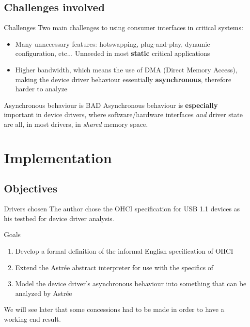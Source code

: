 \documentclass[aspectratio=169]{beamer}
\begin{document}
\subsection{Challenges involved}
\begin{frame}{Challenges}
Two main challenges to using consumer interfaces in critical systems:
\begin{itemize}
    \item Many unnecessary features: hotswapping, plug-and-play, dynamic configuration, etc... Unneeded in most \textbf{static} critical applications
    \item Higher bandwidth, which means the use of DMA (Direct Memory Access), making the device driver behaviour essentially \textbf{asynchronous}, therefore harder to analyze
\end{itemize}
\begin{alertblock}{Asynchronous behaviour is BAD}
Asynchronous behaviour is \textbf{especially} important in device drivers, where software/hardware interfaces \textit{and} driver state are all, in most drivers, in \textit{shared} memory space.
\end{alertblock}
\end{frame}

\section{Implementation}

\subsection{Objectives}
\begin{frame}{Drivers chosen}
    The author chose the OHCI specification for USB 1.1 devices as his testbed for device driver analysis.
    \begin{block}{Goals}
    \begin{enumerate}
        \item Develop a formal definition of the informal English specification of OHCI
        \item Extend the Astrée abstract interpreter for use with the specifics of 
        \item Model the device driver's asynchronous behaviour into something that can be analyzed by Astrée
    \end{enumerate}
    \end{block}
    We will see later that some concessions had to be made in order to have a working end result.
\end{frame}
\end{document}
